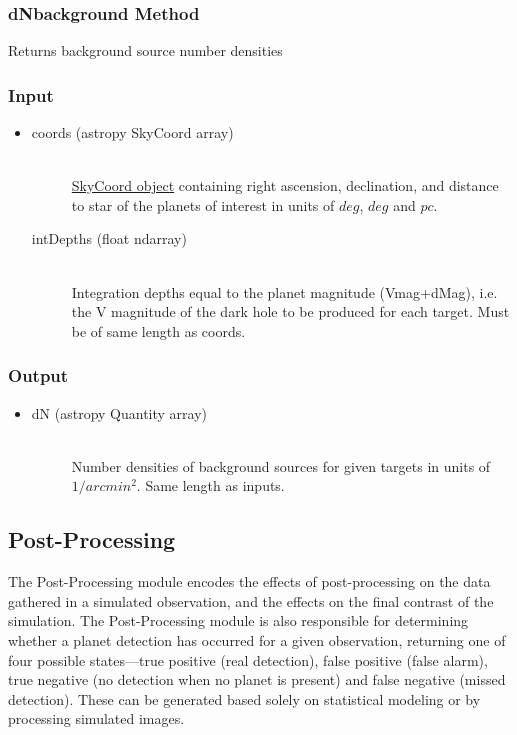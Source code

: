 \documentclass[cleanfoot]{asme2ej}
\begin{document}
\subsubsection{dNbackground Method} \label{sec:dNbackgroundtask}
Returns background source number densities
\subsubsection*{Input}
\begin{itemize}
\item 
\begin{description}
    \item[coords (astropy SkyCoord array)] \hfill \\ \href{http://astropy.readthedocs.org/en/latest/api/astropy.coordinates.SkyCoord.html}{SkyCoord object} containing right ascension, declination, and  distance to star of the planets of interest in units of $ deg $, $ deg $ and $ pc $.
    \item[intDepths (float ndarray)] \hfill \\ Integration depths equal to the planet magnitude (Vmag+dMag), i.e. the V magnitude of the dark hole to be produced for each target. Must be of same length as coords.
\end{description}
\end{itemize}

\subsubsection*{Output}
\begin{itemize}
\item 
\begin{description}
    \item[dN (astropy Quantity array)] \hfill \\ Number densities of background sources for given targets in  units of $ 1/arcmin^2 $. Same length as inputs.
\end{description}
\end{itemize}



\subsection{Post-Processing}\label{sec:postprocessing}
The Post-Processing module encodes the effects of post-processing on the data gathered in a simulated observation, and the effects on the final contrast of the simulation.  The Post-Processing module is also responsible for determining whether a planet detection has occurred for a given observation, returning one of four possible states---true positive (real detection), false positive (false alarm), true negative (no detection when no planet is present) and false negative (missed detection).  These can be generated based solely on statistical modeling or by processing simulated images.
\end{document}

